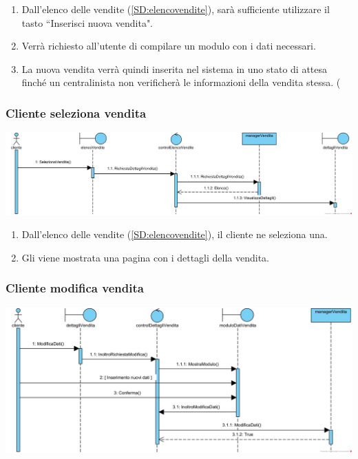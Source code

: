 \documentclass[12pt,a4paper]{article}
\begin{document}
\begin{enumerate}
\item Dall'elenco delle vendite (\ref{SD:elencovendite}), sarà sufficiente utilizzare il tasto ``Inserisci nuova vendita".
\item Verrà richiesto all'utente di compilare un modulo con i dati necessari.
\item La nuova vendita verrà quindi inserita nel sistema in uno stato di attesa finché un centralinista non verificherà le informazioni della vendita stessa. ( %
\end{enumerate}

\subsubsection{Cliente seleziona vendita}
\label{SD:selezionavenditacliente}

\begin{center}
\includegraphics[width=\textwidth]{SequenceDiagram/ClienteSelezionaVendita}
\end{center}

\begin{enumerate}
\item Dall'elenco delle vendite (\ref{SD:elencovendite}), il cliente ne seleziona una.
\item Gli viene mostrata una pagina con i dettagli della vendita.
\end{enumerate}

\subsubsection{Cliente modifica vendita}
\label{SD:modificavendita}

\begin{center}
\includegraphics[width=\textwidth]{SequenceDiagram/ClienteModificaVendita}
\end{center}
\end{document}
